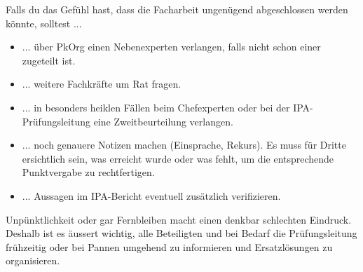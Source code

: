 Falls du das Gefühl hast, dass die Facharbeit ungenügend abgeschlossen werden könnte, solltest ...
\begin{itemize}
  \item ... über PkOrg einen Nebenexperten verlangen, falls nicht schon einer zugeteilt ist.
  \item ... weitere Fachkräfte um Rat fragen.
  \item ... in besonders heiklen Fällen beim Chefexperten oder bei der IPA-Prüfungsleitung eine Zweitbeurteilung verlangen.
  \item ... noch genauere Notizen machen (Einsprache, Rekurs). Es muss für Dritte ersichtlich sein, was erreicht wurde oder was fehlt, um die entsprechende Punktvergabe zu rechtfertigen.
  \item ... Aussagen im IPA-Bericht eventuell zusätzlich verifizieren.
\end{itemize}

Unpünktlichkeit oder gar Fernbleiben macht einen denkbar schlechten Eindruck. Deshalb ist es äussert wichtig, alle Beteiligten und bei Bedarf die Prüfungsleitung frühzeitig oder bei Pannen umgehend zu informieren und Ersatzlösungen zu organisieren.
